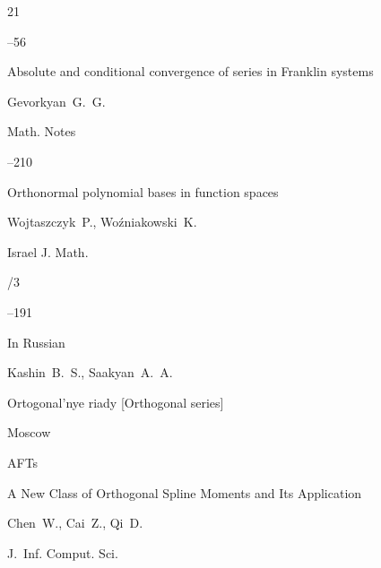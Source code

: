 \begin{thebibliography}{21}


--56





\paper Absolute and conditional convergence of series in Franklin systems

\by Gevorkyan~G.~G.

\jour Math. Notes




--210






\paper Orthonormal polynomial bases in function spaces 

\by Wojtaszczyk~P., Wo\'zniakowski~K. 

\jour Israel J. Math. 



/3

--191





\lang In Russian

\by Kashin~B.~S., Saakyan~A.~A. 

\book Ortogonal'nye riady \rm [Orthogonal series]

\publaddr Moscow

\publ AFTs 






\paper A New Class of Orthogonal Spline Moments and Its Application

\by Chen~W., Cai~Z., Qi~D. 

\jour J.~Inf. Comput. Sci.



\end{thebibliography}

